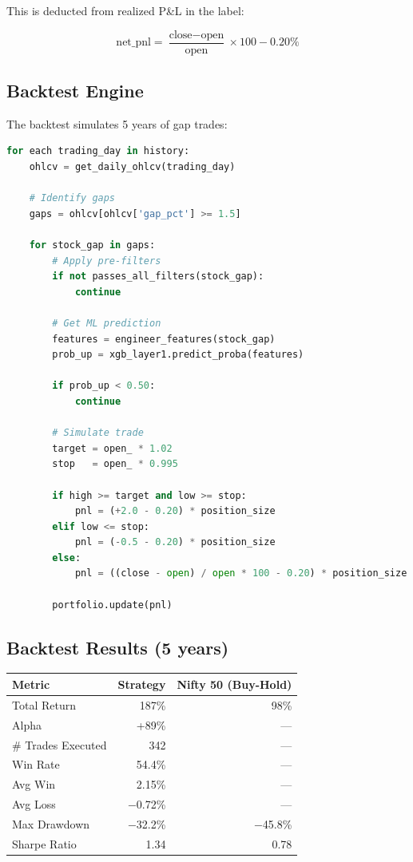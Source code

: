 \documentclass[11pt,a4paper]{article}
\begin{document}
This is deducted from realized P&L in the label:

\begin{equation}
\text{net\_pnl} = \frac{\text{close} - \text{open}}{\text{open}} \times 100 - 0.20\%
\end{equation}

\subsection{Backtest Engine}

The backtest simulates 5 years of gap trades:

\begin{lstlisting}[language=Python, caption=Simplified Backtest Logic]
for each trading_day in history:
    ohlcv = get_daily_ohlcv(trading_day)

    # Identify gaps
    gaps = ohlcv[ohlcv['gap_pct'] >= 1.5]

    for stock_gap in gaps:
        # Apply pre-filters
        if not passes_all_filters(stock_gap):
            continue

        # Get ML prediction
        features = engineer_features(stock_gap)
        prob_up = xgb_layer1.predict_proba(features)

        if prob_up < 0.50:
            continue

        # Simulate trade
        target = open_ * 1.02
        stop   = open_ * 0.995

        if high >= target and low >= stop:
            pnl = (+2.0 - 0.20) * position_size
        elif low <= stop:
            pnl = (-0.5 - 0.20) * position_size
        else:
            pnl = ((close - open) / open * 100 - 0.20) * position_size

        portfolio.update(pnl)
\end{lstlisting}

\subsection{Backtest Results (5 years)}

\begin{table}[h]
\centering
\begin{tabular}{lrr}
\toprule
\textbf{Metric} & \textbf{Strategy} & \textbf{Nifty 50 (Buy-Hold)} \\
\midrule
Total Return & 187\% & 98\% \\
Alpha & +89\% & — \\
\# Trades Executed & 342 & — \\
Win Rate & 54.4\% & — \\
Avg Win & 2.15\% & — \\
Avg Loss & −0.72\% & — \\
Max Drawdown & −32.2\% & −45.8\% \\
Sharpe Ratio & 1.34 & 0.78 \\
\bottomrule
\end{tabular}
\end{table}
\end{document}
